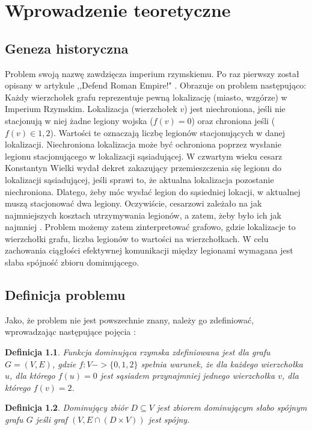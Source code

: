 \chapter{Wprowadzenie teoretyczne}

\section{Geneza historyczna}
Problem swoją nazwę zawdzięcza imperium rzymskiemu. Po raz pierwszy został opisany w artykule ,,Defend Roman Empire!" \cite{defendRomanEmpire}.
Obrazuje on problem następująco: Każdy wierzchołek grafu reprezentuje pewną lokalizację (miasto, wzgórze) w Imperium Rzymskim. Lokalizacja (wierzchołek $v$) jest niechroniona, jeśli nie stacjonują w niej żadne legiony wojska ($f(v) = 0$) oraz chroniona jeśli ($f(v) \in {1,2} $). Wartości te oznaczają liczbę legionów stacjonujących w danej lokalizacji. Niechroniona lokalizacja może być ochroniona poprzez wysłanie legionu stacjonującego w lokalizacji sąsiadującej. W czwartym wieku cesarz Konstantyn Wielki wydał dekret zakazujący przemieszczenia się legionu do lokalizacji sąsiadującej, jeśli sprawi to, że aktualna lokalizacja pozostanie niechroniona. Dlatego, żeby móc wysłać legion do sąsiedniej lokacji, w aktualnej muszą stacjonować dwa legiony. Oczywiście, cesarzowi zależało na jak najmniejszych kosztach utrzymywania legionów, a zatem, żeby było ich jak najmniej \cite{theoryWCRDF}. Problem możemy zatem zinterpretować grafowo, gdzie lokalizacje to wierzchołki grafu, liczba legionów to wartości na wierzchołkach. W celu zachowania ciągłości efektywnej komunikacji między legionami wymagana jest słaba spójność zbioru dominującego.

\section{Definicja problemu}
Jako, że problem nie jest powszechnie znany, należy go zdefiniować, wprowadzając następujące pojęcia \cite{theoryWCRDF}:

\newtheorem{definition}{Definicja}

\begin{definition}
    Funkcja dominująca rzymska zdefiniowana jest dla grafu $G = (V, E)$, gdzie $f: V -> \{0,1,2\}$ spełnia warunek, że dla każdego wierzchołka $u$, dla którego $f(u) = 0$ jest sąsiadem przynajmniej jednego wierzchołka $v$, dla którego $f(v) = 2$.
\end{definition}

\begin{definition}
    Dominujący zbiór $D \subseteq V$ jest zbiorem dominującym słabo spójnym grafu $G$ jeśli graf $(V,E \cap (D \times V))$ jest spójny.
\end{definition}

